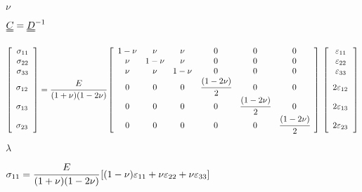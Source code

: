 \documentclass[onecolumn,11pt]{report}
\def\lthtmlcheckvsize{\ifdim\ht\sizebox<\vsize 
  \ifdim\wd\sizebox<\hsize\expandafter\hfill\fi \expandafter\vfill
  \else\expandafter\vss\fi}%
\begin{document}
{\newpage\clearpage
{}%
$ \nu$%
\lthtmlindisplaymathZ
\lthtmlcheckvsize\clearpage}

{\newpage\clearpage
{}%
$ \uuline{C} = \uuline{D}^{-1}$%
\lthtmlindisplaymathZ
\lthtmlcheckvsize\clearpage}

{\newpage\clearpage
{}%
\begin{displaymath}%
	\left[
\begin{array} {c}
\sigma_{11} \\
\sigma_{22} \\
\sigma_{33} \\
\sigma_{12} \cfrac{}{} \\
\sigma_{13} \cfrac{}{} \\
\sigma_{23} \cfrac{}{}
\end{array}
\right]
= \cfrac{E}{(1+\nu)(1-2\nu)}
\left[
\begin{array}{cccccc}
1-\nu & \nu & \nu & 0 & 0 & 0\\
\nu & 1-\nu & \nu & 0 & 0 & 0\\
\nu & \nu & 1-\nu & 0 & 0 & 0\\
0 & 0 & 0 & \cfrac{(1-2\nu)}{2} & 0 & 0 \\
0 & 0 & 0 & 0 & \cfrac{(1-2\nu)}{2} & 0 \\
0 & 0 & 0 & 0 & 0 & \cfrac{(1-2\nu)}{2}
\end{array}
\right]
\:
\left[
\begin{array} {c}
\varepsilon_{11} \\
\varepsilon_{22} \\
\varepsilon_{33} \\
2 \varepsilon_{12} \cfrac{}{} \\
2 \varepsilon_{13}  \cfrac{}{}\\
2 \varepsilon_{23} \cfrac{}{}
\end{array}
\right]\end{displaymath}%
\lthtmldisplayZ
\lthtmlcheckvsize\clearpage}

{\newpage\clearpage
{}%
$ \lambda$%
\lthtmlindisplaymathZ
\lthtmlcheckvsize\clearpage}

{\newpage\clearpage
{}%
$\displaystyle \sigma_{11}  = \cfrac{E}{(1+\nu)(1-2\nu)}
\left[ (1-\nu) \varepsilon_{11} + \nu \varepsilon_{22} + \nu \varepsilon_{33} \right]$%
\lthtmlindisplaymathZ
\lthtmlcheckvsize\clearpage}
\end{document}
